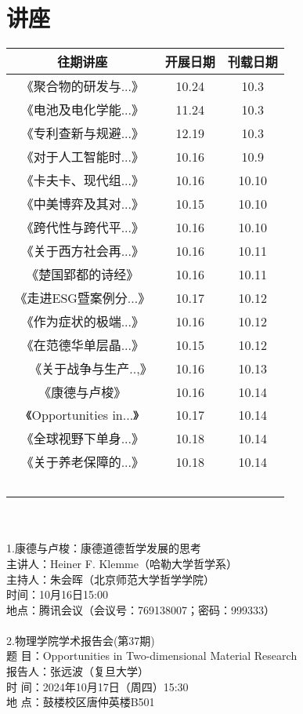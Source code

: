 \documentclass[letterpaper, 12pt]{article}
\begin{document}
\begin{multicols}{2}
\begin{tabular}{|c|c|c|}
    \hline
\end{tabular}
\section{讲座}
\begin{tabular}{|c|c|c|}
    \hline
    往期讲座 & 开展日期 & 刊载日期\\
    \hline\hline
    《聚合物的研发与...》 & 10.24 & 10.3\\
    《电池及电化学能...》 & 11.24 & 10.3\\
    《专利查新与规避...》 & 12.19 & 10.3\\
    《对于人工智能时...》 & 10.16 & 10.9\\
    《卡夫卡、现代组...》 & 10.16 & 10.10\\
    《中美博弈及其对...》 & 10.15 & 10.10\\
    《跨代性与跨代平...》 & 10.16 & 10.10\\
    《关于西方社会再...》 & 10.16 & 10.11\\
    《楚国郢都的诗经》 & 10.16 & 10.11\\
    《走进ESG暨案例分...》 & 10.17 & 10.12\\
    《作为症状的极端...》 & 10.16 & 10.12\\
    《在范德华单层晶...》 & 10.15 & 10.12\\  
    《关于战争与生产..,》 & 10.16 & 10.13\\
    《康德与卢梭》 & 10.16 & 10.14\\
    《Opportunities in...》 & 10.17 & 10.14\\
    《全球视野下单身...》 & 10.18 & 10.14\\
    《关于养老保障的...》 & 10.18 & 10.14\\
    \hline  
\end{tabular}\\\\
1.康德与卢梭：康德道德哲学发展的思考\\
主讲人：Heiner F. Klemme（哈勒大学哲学系）\\
主持人：朱会晖（北京师范大学哲学学院）\\
时间：10月16日15:00\\
地点：腾讯会议（会议号：769138007；密码：999333）\\\\

2.物理学院学术报告会(第37期)\\
题   目：Opportunities in Two-dimensional Material Research\\
报告人：张远波（复旦大学）\\
时   间：2024年10月17日（周四）15:30\\
地   点：鼓楼校区唐仲英楼B501\\


\end{multicols}
\end{document}

